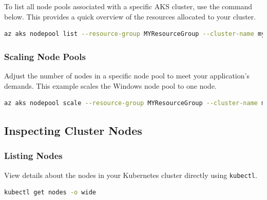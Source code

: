 \documentclass{article}
\begin{document}
To list all node pools associated with a specific AKS cluster, use the command below. This provides a quick overview of the resources allocated to your cluster.

\begin{lstlisting}[language=bash]
az aks nodepool list --resource-group MYResourceGroup --cluster-name myAKSCluster --output table
\end{lstlisting}

\subsubsection{Scaling Node Pools}

Adjust the number of nodes in a specific node pool to meet your application's demands. This example scales the Windows node pool to one node.

\begin{lstlisting}[language=bash]
az aks nodepool scale --resource-group MYResourceGroup --cluster-name myAKSCluster --name winnp --node-count 1
\end{lstlisting}

%
%

\subsection{Inspecting Cluster Nodes}

\subsubsection{Listing Nodes}

View details about the nodes in your Kubernetes cluster directly using \texttt{kubectl}.

\begin{lstlisting}[language=bash]
kubectl get nodes -o wide
\end{lstlisting}
\end{document}
